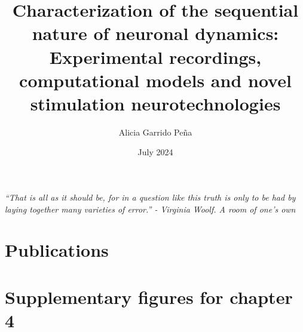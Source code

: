 \documentclass[11pt,a4paper,twoside]{book} %
\title{Characterization of the sequential nature of neuronal dynamics: Experimental recordings, computational models and novel stimulation neurotechnologies}
\author{Alicia Garrido Peña}
\date{July 2024}
\numberwithin{equation}{section}
\begin{document}
 \maketitle


 \newpage
 \newpage
 \clearpage
 \vfill
 \vspace{100pt}
 {\centering \large \textit{``That is all as it should be, for in a question like this truth is only to be had by laying together many
 		varieties of error.'' - Virginia Woolf. A room of one's own}\par}

 \vfill
 
 


\clearpage
\newpage


 \tableofcontents
 \listoftables
 \listoffigures

 \newpage



\resetpagenumbering

 
 
 
 

 
 
 

%
%
\begin{refcontext}[sorting=nyt]
	\printbibliography
\end{refcontext}

\begin{appendix}
\chapter{Publications}

\begin{refsection}
\nocite{*}

\printbibliography[heading={subbibliography},title={Journal Publications},keyword=journal]

\printbibliography[heading={subbibliography},title={International Conference Contributions},keyword=conference]

\end{refsection}

\chapter{Supplementary figures for chapter 4}



\end{appendix}
\end{document}
